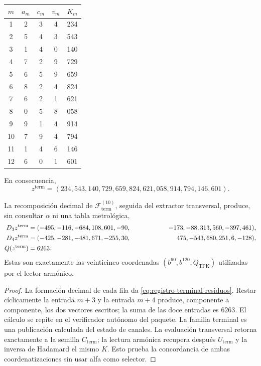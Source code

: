 \begin{center}
\begin{tabular}{c@{\qquad}ccc@{\qquad}c}
\toprule
\(m\)&\(a_m\)&\(c_m\)&\(v_m\)&\(K_m\)\\
\midrule
1&2&3&4&234\\
2&5&4&3&543\\
3&1&4&0&140\\
4&7&2&9&729\\
5&6&5&9&659\\
6&8&2&4&824\\
7&6&2&1&621\\
8&0&5&8&058\\
9&9&1&4&914\\
10&7&9&4&794\\
11&1&4&6&146\\
12&6&0&1&601\\
\bottomrule
\end{tabular}
\end{center}
En consecuencia,
\begin{equation}
 z^{\mathrm{term}}
 =(234,543,140,729,659,824,621,058,914,794,146,601).
 \label{eq:registro-terminal-residuos}
\end{equation}

\begin{proposition}
\label{prop:registro-terminal-coordenadas}
La recomposición decimal de \(\mathscr F_{\mathrm{term}}^{(10)}\), seguida
del extractor transversal, produce, sin consultar \(\alpha\) ni una tabla
metrológica,
\begin{align*}
 D_3z^{\mathrm{term}}={}&(-495,-116,-684,108,601,-90,
 &\hspace{18mm}-173,-88,313,560,-397,461),\\
 D_4z^{\mathrm{term}}={}&(-425,-281,-481,671,-255,30,
 &\hspace{18mm}475,-543,680,251,6,-128),\\
 Q(z^{\mathrm{term}})={}&6263.
\end{align*}
Estas son exactamente las veinticinco coordenadas
\((b^{90},b^{120},Q_{\mathrm{TPK}})\) utilizadas por el lector armónico.
\end{proposition}

\begin{proof}
La formación decimal de cada fila da
\eqref{eq:registro-terminal-residuos}. Restar cíclicamente la entrada
\(m+3\) y la entrada \(m+4\) produce, componente a componente, los dos
vectores escritos; la suma de las doce entradas es \(6263\). El cálculo se
repite en el verificador autónomo del paquete. La familia terminal es una
publicación calculada del estado de canales. La evaluación transversal retorna
exactamente a la semilla \(C_{\mathrm{term}}\); la lectura armónica recupera
después \(U_{\mathrm{term}}\) y la inversa de Hadamard el mismo \(K\). Esto
prueba la concordancia de ambas coordenatizaciones sin usar alfa como selector.
\end{proof}


